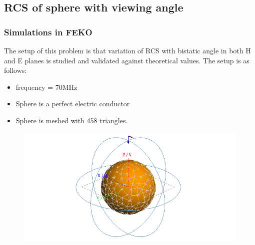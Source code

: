 \documentclass{beamer}
\begin{document}
\begin{frame}
\subsection{RCS of sphere with viewing angle}
\frametitle{Simulations in FEKO}
The setup of this problem is that variation of RCS with bistatic angle in both H and E planes is studied and validated against theoretical values.
The setup is as follows:
\begin{itemize}
\item frequency = 70MHz
\item Sphere is a perfect electric conductor
\item Sphere is meshed with 458 triangles.
\end{itemize}
\begin{figure}[H]
\centering
\includegraphics[scale = 0.5]{prob2.PNG}
\end{figure}
\end{frame}
\end{document}
